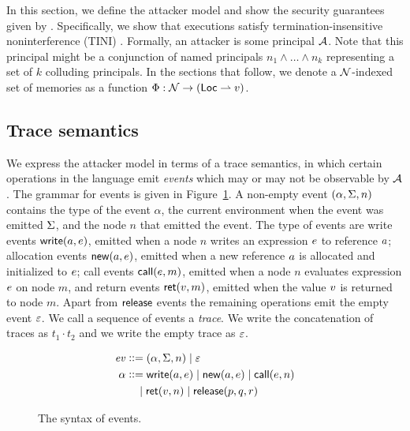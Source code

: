 In this section, we define the attacker model and show the security guarantees given by \lang. Specifically, we show that \lang{} executions satisfy termination-insensitive noninterference (TINI) \cite{4223226}. Formally, an attacker is some principal $\mathcal{A}$. Note that this principal might be a conjunction of named principals $n_1 \wedge \dots \wedge n_k$ representing a set of $k$ colluding principals. In the sections that follow, we denote a $\mathcal{N}$-indexed set of memories as a function $\Phi: \mathcal{N} \to (\mathsf{Loc} \rightharpoonup v)$.

\subsection{Trace semantics}
We express the attacker model in terms of a trace semantics, in which certain operations in the language emit \emph{events} which may or may not be observable by $\mathcal{A}$. The grammar for events is given in Figure~\ref{fig:event-syntax}. A non-empty event $(\alpha, \Sigma, n)$ contains the type of the event $\alpha$, the current environment when the event was emitted $\Sigma$, and the node $n$ that emitted the event. The type of events are write events $\mathsf{write}(a, e)$, emitted when a node $n$ writes an expression $e$ to reference $a$; allocation events $\mathsf{new}(a, e)$, emitted when a new reference $a$ is allocated and initialized to $e$; call events $\mathsf{call}(e, m)$, emitted when a node $n$ evaluates expression $e$ on node $m$, and return events $\mathsf{ret}(v, m)$, emitted when the value $v$ is returned to node $m$. Apart from $\mathsf{release}$ events the remaining operations emit the empty event $\varepsilon$. We call a sequence of events a \emph{trace}. We write the concatenation of traces as $t_1 \cdot t_2$ and we write the empty trace as $\varepsilon$.

\begin{figure}
\centering
\begin{align*}
\mathit{ev} &\vcentcolon\vcentcolon= (\alpha, \Sigma, n) \mid \varepsilon\\
\alpha &\vcentcolon\vcentcolon= \mathsf{write}(a, e) \mid \mathsf{new}(a, e) \mid \mathsf{call}(e, n) \\ &\quad \mid \mathsf{ret}(v, n) \mid \mathsf{release}(p, q, r)
\end{align*}
\caption{The syntax of events.}
\label{fig:event-syntax}
\end{figure}

